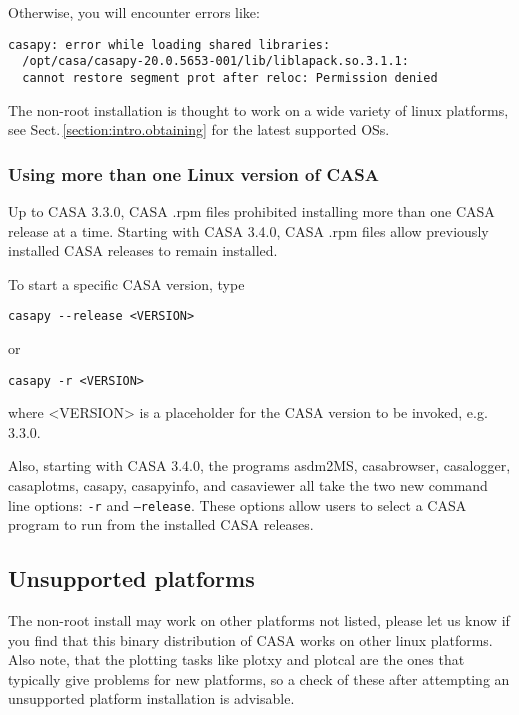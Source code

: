 Otherwise, you will encounter errors like:


\small
\begin{verbatim}
casapy: error while loading shared libraries: 
  /opt/casa/casapy-20.0.5653-001/lib/liblapack.so.3.1.1: 
  cannot restore segment prot after reloc: Permission denied
\end{verbatim}
\normalsize

The non-root installation is thought to work on a wide variety of
linux platforms, see Sect.\,\ref{section:intro.obtaining} for the
latest supported OSs.

\subsubsection{Using more than one Linux version of CASA}
Up to CASA 3.3.0, CASA .rpm files prohibited installing more than one
CASA release at a time.  Starting with CASA 3.4.0, CASA .rpm files
allow previously installed CASA releases to remain installed.

To start a specific CASA version, type 

\small
\begin{verbatim}
casapy --release <VERSION>
\end{verbatim}
\normalsize
or 
\small
\begin{verbatim}
casapy -r <VERSION>
\end{verbatim}
\normalsize

where <VERSION> is a placeholder for the CASA version to be invoked, e.g. 3.3.0. 

Also, starting with CASA 3.4.0, the programs asdm2MS, casabrowser,
casalogger, casaplotms, casapy, casapyinfo, and casaviewer all take
the two new command line options: {\tt -r} and {\tt --release}.  These options
allow users to select a CASA program to run from the installed CASA
releases.




\subsection{Unsupported platforms}

The non-root install may work on other platforms not listed, please
let us know if you find that this binary distribution of CASA works on
other linux platforms. Also note, that the plotting tasks like plotxy
and plotcal are the ones that typically give problems for new
platforms, so a check of these after attempting an unsupported
platform installation is advisable.


